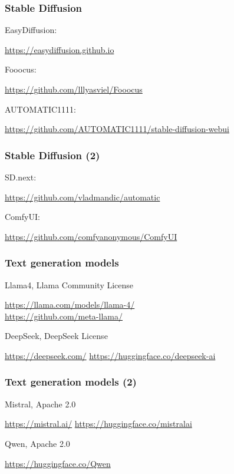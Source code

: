 \documentclass[17pt,aspectratio=169,hyperref={pdfusetitle,colorlinks,allcolors=olive}]{beamer}
\begin{document}
\begin{frame}[fragile]
\frametitle{Stable Diffusion}

EasyDiffusion:
\begin{flushright}
\url{https://easydiffusion.github.io}
\end{flushright}

Fooocus:
\begin{flushright}
\url{https://github.com/lllyasviel/Fooocus}
\end{flushright}

AUTOMATIC1111:
\begin{flushright}
\url{https://github.com/AUTOMATIC1111/stable-diffusion-webui}
\end{flushright}

\end{frame}

\begin{frame}[fragile]
\frametitle{Stable Diffusion (2)}

SD.next:
\begin{flushright}
\url{https://github.com/vladmandic/automatic}
\end{flushright}

ComfyUI:
\begin{flushright}
\url{https://github.com/comfyanonymous/ComfyUI}
\end{flushright}

\end{frame}

\begin{frame}[fragile]
\frametitle{Text generation models}

Llama4, Llama Community License
\begin{flushright}
  \url{https://llama.com/models/llama-4/} \\
  \url{https://github.com/meta-llama/} \\
\end{flushright}

DeepSeek, DeepSeek License

\begin{flushright}
  \url{https://deepseek.com/}
  \url{https://huggingface.co/deepseek-ai}
\end{flushright}

\end{frame}

\begin{frame}[fragile]
\frametitle{Text generation models (2)}

Mistral, Apache 2.0

\begin{flushright}
  \url{https://mistral.ai/}
  \url{https://huggingface.co/mistralai}
\end{flushright}


Qwen, Apache 2.0

\begin{flushright}
  \url{https://huggingface.co/Qwen}
\end{flushright}

\end{frame}
\end{document}
